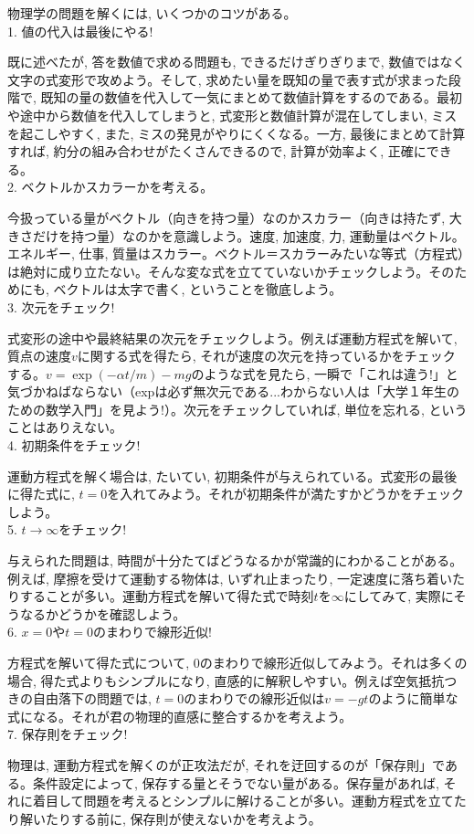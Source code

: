 {\small 物理学の問題を解くには, いくつかのコツがある。\\

1. 値の代入は最後にやる!

既に述べたが, 答を数値で求める問題も, できるだけぎりぎりまで, 数値ではなく文字の式変形で攻めよう。そして, 求めたい量を既知の量で表す式が求まった段階で, 既知の量の数値を代入して一気にまとめて数値計算をするのである。最初や途中から数値を代入してしまうと, 式変形と数値計算が混在してしまい, ミスを起こしやすく, また, ミスの発見がやりにくくなる。一方, 最後にまとめて計算すれば, 約分の組み合わせがたくさんできるので, 計算が効率よく, 正確にできる。\\

2. ベクトルかスカラーかを考える。

今扱っている量がベクトル（向きを持つ量）なのかスカラー（向きは持たず, 大きさだけを持つ量）なのかを意識しよう。速度, 加速度, 力, 運動量はベクトル。エネルギー, 仕事, 質量はスカラー。ベクトル＝スカラーみたいな等式（方程式）は絶対に成り立たない。そんな変な式を立てていないかチェックしよう。そのためにも, ベクトルは太字で書く, ということを徹底しよう。\\

3. 次元をチェック!

式変形の途中や最終結果の次元をチェックしよう。例えば運動方程式を解いて, 質点の速度$v$に関する式を得たら, それが速度の次元を持っているかをチェックする。$v=\exp(-\alpha t/m)-mg$のような式を見たら, 一瞬で「これは違う!」と気づかねばならない（expは必ず無次元である...わからない人は「大学１年生のための数学入門」を見よう!）。次元をチェックしていれば, 単位を忘れる, ということはありえない。\\

4. 初期条件をチェック!

運動方程式を解く場合は, たいてい, 初期条件が与えられている。式変形の最後に得た式に, $t=0$を入れてみよう。それが初期条件が満たすかどうかをチェックしよう。\\

5. $t\rightarrow\infty$をチェック!

与えられた問題は, 時間が十分たてばどうなるかが常識的にわかることがある。例えば, 摩擦を受けて運動する物体は, いずれ止まったり, 一定速度に落ち着いたりすることが多い。運動方程式を解いて得た式で時刻$t$を$\infty$にしてみて, 実際にそうなるかどうかを確認しよう。\\

6. $x=0$や$t=0$のまわりで線形近似!

方程式を解いて得た式について, 0のまわりで線形近似してみよう。それは多くの場合, 得た式よりもシンプルになり, 直感的に解釈しやすい。例えば空気抵抗つきの自由落下の問題では, $t=0$のまわりでの線形近似は$v=-gt$のように簡単な式になる。それが君の物理的直感に整合するかを考えよう。\\

7. 保存則をチェック!

物理は, 運動方程式を解くのが正攻法だが, それを迂回するのが「保存則」である。条件設定によって, 保存する量とそうでない量がある。保存量があれば, それに着目して問題を考えるとシンプルに解けることが多い。運動方程式を立てたり解いたりする前に, 保存則が使えないかを考えよう。}
